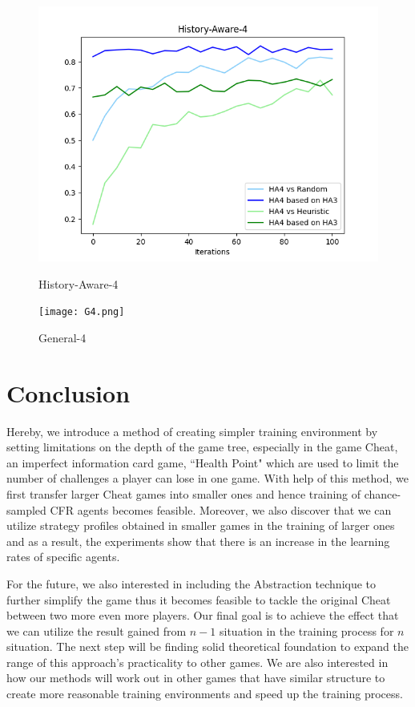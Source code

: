 \documentclass[runningheads]{llncs}
\begin{document}
        \begin{figure}[htbp]
    \centering
        \begin{minipage}[t]{0.48\textwidth}
        \centering
    	\includegraphics[width=\linewidth]{HA4.png}
     	\caption{History-Aware-4}
     	\label{fig:HA4}
    \end{minipage}
            \begin{minipage}[t]{0.48\textwidth}
        \centering
    	\texttt{[image: G4.png]}
     	\caption{General-4}
     	\label{fig:G4}
    \end{minipage}

    \end{figure}

\section{Conclusion}
    Hereby, we introduce a method of creating simpler training environment by setting limitations on the depth of the game tree, especially in the game Cheat, an imperfect information card game, ``Health Point" which are used to limit the number of challenges a player can lose in one game. With help of this method, we first transfer larger Cheat games into smaller ones and hence training of chance-sampled CFR agents becomes feasible. Moreover, we also discover that we can utilize strategy profiles obtained in smaller games in the training of larger ones and as a result, the experiments show that there is an increase in the learning rates of specific agents.

    For the future, we also interested in including the Abstraction technique to further simplify the game thus it becomes feasible to tackle the original Cheat between two more even more players. Our final goal is to achieve the effect that we can utilize the result gained from $n-1$ situation in the training process for $n$ situation. The next step will be finding solid theoretical foundation to expand the range of this approach's practicality to other games. We are also interested in how our methods will work out in other games that have similar structure to create more reasonable training environments and speed up the training process. 

%


\end{document}
